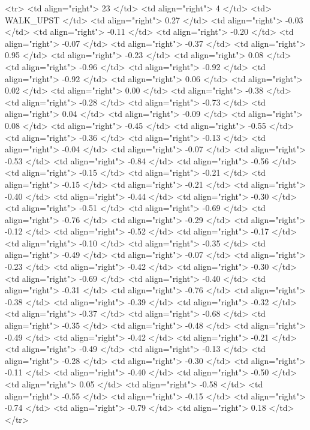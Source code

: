   <tr> <td align="right"> 23 </td> <td align="right">   4 </td> <td> WALK_UPST </td> <td align="right"> 0.27 </td> <td align="right"> -0.03 </td> <td align="right"> -0.11 </td> <td align="right"> -0.20 </td> <td align="right"> -0.07 </td> <td align="right"> -0.37 </td> <td align="right"> 0.95 </td> <td align="right"> -0.23 </td> <td align="right"> 0.08 </td> <td align="right"> -0.96 </td> <td align="right"> -0.92 </td> <td align="right"> -0.92 </td> <td align="right"> 0.06 </td> <td align="right"> 0.02 </td> <td align="right"> 0.00 </td> <td align="right"> -0.38 </td> <td align="right"> -0.28 </td> <td align="right"> -0.73 </td> <td align="right"> 0.04 </td> <td align="right"> -0.09 </td> <td align="right"> 0.08 </td> <td align="right"> -0.45 </td> <td align="right"> -0.55 </td> <td align="right"> -0.36 </td> <td align="right"> -0.13 </td> <td align="right"> -0.04 </td> <td align="right"> -0.07 </td> <td align="right"> -0.53 </td> <td align="right"> -0.84 </td> <td align="right"> -0.56 </td> <td align="right"> -0.15 </td> <td align="right"> -0.21 </td> <td align="right"> -0.15 </td> <td align="right"> -0.21 </td> <td align="right"> -0.40 </td> <td align="right"> -0.44 </td> <td align="right"> -0.30 </td> <td align="right"> -0.51 </td> <td align="right"> -0.69 </td> <td align="right"> -0.76 </td> <td align="right"> -0.29 </td> <td align="right"> -0.12 </td> <td align="right"> -0.52 </td> <td align="right"> -0.17 </td> <td align="right"> -0.10 </td> <td align="right"> -0.35 </td> <td align="right"> -0.49 </td> <td align="right"> -0.07 </td> <td align="right"> -0.23 </td> <td align="right"> -0.42 </td> <td align="right"> -0.30 </td> <td align="right"> -0.69 </td> <td align="right"> -0.40 </td> <td align="right"> -0.31 </td> <td align="right"> -0.76 </td> <td align="right"> -0.38 </td> <td align="right"> -0.39 </td> <td align="right"> -0.32 </td> <td align="right"> -0.37 </td> <td align="right"> -0.68 </td> <td align="right"> -0.35 </td> <td align="right"> -0.48 </td> <td align="right"> -0.49 </td> <td align="right"> -0.42 </td> <td align="right"> -0.21 </td> <td align="right"> -0.49 </td> <td align="right"> -0.13 </td> <td align="right"> -0.28 </td> <td align="right"> -0.30 </td> <td align="right"> -0.11 </td> <td align="right"> -0.40 </td> <td align="right"> -0.50 </td> <td align="right"> 0.05 </td> <td align="right"> -0.58 </td> <td align="right"> -0.55 </td> <td align="right"> -0.15 </td> <td align="right"> -0.74 </td> <td align="right"> -0.79 </td> <td align="right"> 0.18 </td> </tr>
